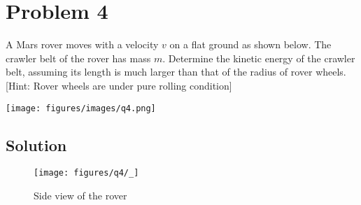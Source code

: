 \section*{Problem 4}

A Mars rover moves with a velocity \(v\) on a flat ground as shown below.
The crawler belt of the rover has mass \(m\).
Determine the kinetic energy of the crawler belt, assuming its length is much larger than that of the radius of rover wheels. [Hint: Rover wheels are under pure rolling condition]

\begin{figure*}[h]
    \centering
    \texttt{[image: figures/images/q4.png]}
\end{figure*}

\subsection*{Solution}

\begin{figure}[htb]
    \centering
    \texttt{[image: figures/q4/\_]}
    \caption{
        Side view of the rover
    }
\end{figure}
